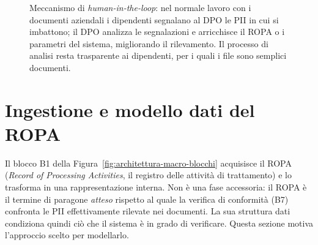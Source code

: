 \begin{figure}[htbp]
	\caption{Meccanismo di \emph{human-in-the-loop}: nel normale lavoro con i
		documenti aziendali i dipendenti segnalano al DPO le PII in cui si imbattono;
		il DPO analizza le segnalazioni e arricchisce il ROPA o i parametri del
		sistema, migliorando il rilevamento. Il processo di analisi resta trasparente
		ai dipendenti, per i quali i file sono semplici documenti.}
	\label{fig:human-in-the-loop}
\end{figure}

\FloatBarrier



\section{Ingestione e modello dati del ROPA}
\label{sec:modello-ropa}

Il blocco B1 della Figura~\ref{fig:architettura-macro-blocchi} acquisisce il ROPA (\textit{Record of Processing Activities}, il registro delle attività di trattamento) e lo trasforma in una rappresentazione interna. Non è una fase accessoria: il ROPA è il termine di paragone \textit{atteso} rispetto al quale la verifica di conformità (B7) confronta le PII effettivamente rilevate nei documenti. La sua struttura dati condiziona quindi ciò che il sistema è in grado di verificare. Questa sezione motiva l'approccio scelto per modellarlo.

